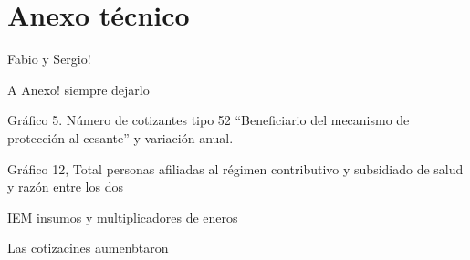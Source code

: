 \section{Anexo técnico}
Fabio y Sergio! 

A Anexo! siempre dejarlo

Gráfico 5. Número de cotizantes tipo 52
“Beneficiario del mecanismo de protección al cesante” y
variación anual.

Gráfico 12, Total personas afiliadas al régimen contributivo
y subsidiado de salud y razón entre los dos

IEM insumos y multiplicadores de eneros 



Las cotizacines aumenbtaron 